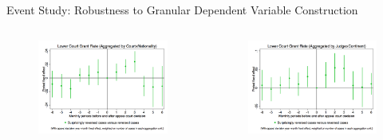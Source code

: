 \begin{frame}{Event Study: Robustness to Granular Dependent Variable Construction}
    \begin{columns}

        \begin{column}{0.45\textwidth}
            \begin{figure}
            \centering
            \includegraphics[height = 0.6 \textheight]{images/int_mth3_2.png}
            \end{figure}
        \end{column}
        
        \begin{column}{0.45\textwidth}
            \begin{figure}
                \centering
                \includegraphics[height = 0.6 \textheight]{images/int_mth4_2.png}
            \end{figure}
        \end{column}
        \end{columns}
    
\end{frame}

